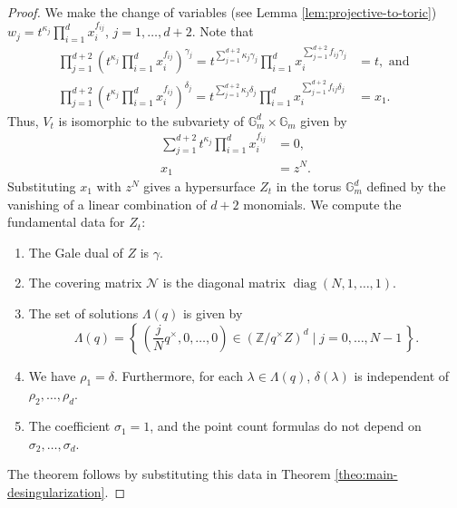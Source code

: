 \documentclass[11pt, reqno]{amsart}
\theoremstyle{plain}
\theoremstyle{definition}
\newcommand{\Z}{\mathbb{Z}}
\newcommand{\ga}{\gamma}
\newcommand{\G}{\mathbb{G}}
\begin{document}
\begin{proof}
We make the change of variables (see Lemma \ref{lem:projective-to-toric})
$w_j = t^{\kappa_j} \prod_{i=1}^{d} x_i^{f_{ij}}$, $j=1,\dots, d+2$.
Note that 
\begin{align*}
     \prod_{j=1}^{d+2} \left( t^{\kappa_j} \prod_{i=1}^{d} x_i^{f_{ij}} \right)^{\ga_j}=t^{\sum_{j=1}^{d+2} \kappa_j \ga_j }   \prod_{i=1}^{d} x_{i}^{\sum_{j=1}^{d+2}f_{ij} \ga_j} &= t, \text { and }\\
    \prod_{j=1}^{d+2} \left( t^{\kappa_j} \prod_{i=1}^{d} x_i^{f_{ij}} \right)^{\delta_j} =  t^{\sum_{j=1}^{d+2} \kappa_j \delta_j }   \prod_{i=1}^{d} x_{i}^{\sum_{j=1}^{d+2}f_{ij} \delta_j} &= x_1.
\end{align*}
Thus, $V_t$ is isomorphic to the subvariety of $\G_m^{d} \times \G_m$ given by
\begin{align*}
 \sum_{j=1}^{d+2} t^{\kappa_j} \prod_{i=1}^{d} x_i^{f_{ij}}&=0,\\   
 x_1 & = z^{N}.
\end{align*}
Substituting $x_1$ with $z^{N}$ gives a hypersurface $Z_t$ in the torus $\G_m^{d}$ defined by the vanishing of a linear combination of $d+2$ monomials. 
We compute the fundamental data for $Z_t$: 
\begin{enumerate}
    \item The Gale dual of $Z$ is $\ga.$
    \item The covering matrix $\mathcal{N}$ is the diagonal matrix $\operatorname{diag}(N,1,\dots,1)$.
    \item  The set of solutions $\Lambda(q)$ is given by 
    \[
\Lambda(q) = \left\{ \, \left(\frac{j}{N} q^\times,0, \dots, 0\right) \in \left(\Z/q^\times Z\right)^{d} \mid j=0, \dots, N-1 \, \right \}.\]
    \item We have $\rho_{1} =\delta$. Furthermore, for each $\lambda \in \Lambda(q)$, $\delta(\lambda)$ is independent of $\rho_2, \dots,\rho_d$.
    \item The coefficient $\sigma_1 =1$, and the point count formulas do not depend on  $\sigma_2, \dots, \sigma_{d}$.
\end{enumerate}
The theorem follows by substituting this data in Theorem \ref{theo:main-desingularization}.
\end{proof}
\end{document}
